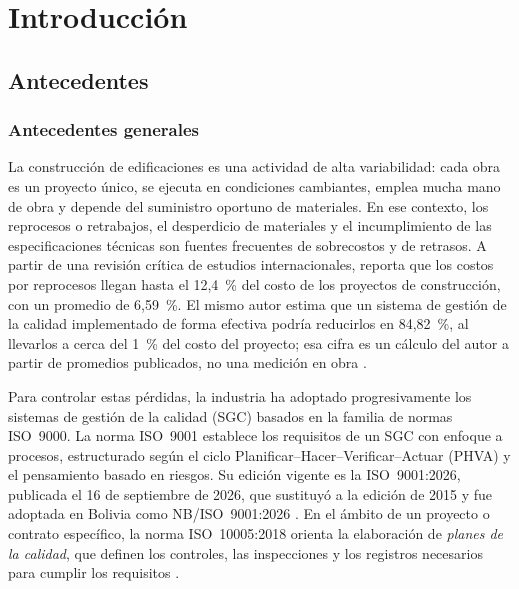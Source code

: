 \chapter*{Introducción}
\setcounter{section}{0}
\renewcommand{\thesection}{\arabic{section}}

\section{Antecedentes}

\subsection{Antecedentes generales}

La construcción de edificaciones es una actividad de alta variabilidad: cada obra es un proyecto único, se ejecuta en condiciones cambiantes, emplea mucha mano de obra y depende del suministro oportuno de materiales. En ese contexto, los reprocesos o retrabajos, el desperdicio de materiales y el incumplimiento de las especificaciones técnicas son fuentes frecuentes de sobrecostos y de retrasos. A partir de una revisión crítica de estudios internacionales, \textcite[p.~5]{alvarez2014} reporta que los costos por reprocesos llegan hasta el 12,4~\% del costo de los proyectos de construcción, con un promedio de 6,59~\%. El mismo autor estima que un sistema de gestión de la calidad implementado de forma efectiva podría reducirlos en 84,82~\%, al llevarlos a cerca del 1~\% del costo del proyecto; esa cifra es un cálculo del autor a partir de promedios publicados, no una medición en obra \parencite[pp.~5, 20]{alvarez2014}.

Para controlar estas pérdidas, la industria ha adoptado progresivamente los sistemas de gestión de la calidad (SGC) basados en la familia de normas ISO~9000. La norma ISO~9001 establece los requisitos de un SGC con enfoque a procesos, estructurado según el ciclo Planificar--Hacer--Verificar--Actuar (PHVA) y el pensamiento basado en riesgos. Su edición vigente es la ISO~9001:2026, publicada el 16 de septiembre de 2026, que sustituyó a la edición de 2015 y fue adoptada en Bolivia como NB/ISO~9001:2026 \parencite{iso9001_2026,ibnorca9001_2026}. En el ámbito de un proyecto o contrato específico, la norma ISO~10005:2018 orienta la elaboración de \emph{planes de la calidad}, que definen los controles, las inspecciones y los registros necesarios para cumplir los requisitos \parencite{iso10005_2018}.

